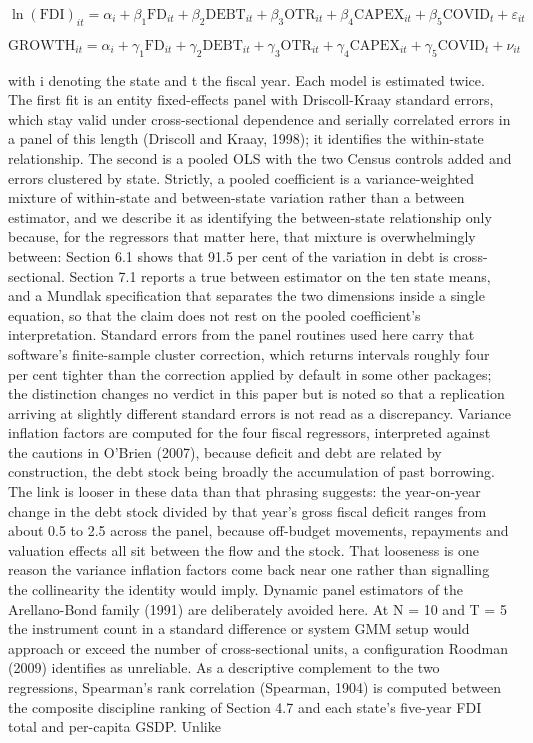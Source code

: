 \documentclass[12pt,a4paper]{article}
\begin{document}
\begin{equation}
\ln(\mathrm{FDI})_{it} = \alpha_i + \beta_1 \mathrm{FD}_{it} + \beta_2 \mathrm{DEBT}_{it} + \beta_3 \mathrm{OTR}_{it} + \beta_4 \mathrm{CAPEX}_{it} + \beta_5 \mathrm{COVID}_{t} + \varepsilon_{it}
\end{equation}

\begin{equation}
\mathrm{GROWTH}_{it} = \alpha_i + \gamma_1 \mathrm{FD}_{it} + \gamma_2 \mathrm{DEBT}_{it} + \gamma_3 \mathrm{OTR}_{it} + \gamma_4 \mathrm{CAPEX}_{it} + \gamma_5 \mathrm{COVID}_{t} + \nu_{it}
\end{equation}

with i denoting the state and t the fiscal year. Each model is estimated twice. The first fit is an entity fixed-effects panel with Driscoll-Kraay standard errors, which stay valid under cross-sectional dependence and serially correlated errors in a panel of this length (Driscoll and Kraay, 1998); it identifies the within-state relationship. The second is a pooled OLS with the two Census controls added and errors clustered by state. Strictly, a pooled coefficient is a variance-weighted mixture of within-state and between-state variation rather than a between estimator, and we describe it as identifying the between-state relationship only because, for the regressors that matter here, that mixture is overwhelmingly between: Section 6.1 shows that 91.5 per cent of the variation in debt is cross-sectional. Section 7.1 reports a true between estimator on the ten state means, and a Mundlak specification that separates the two dimensions inside a single equation, so that the claim does not rest on the pooled coefficient's interpretation. Standard errors from the panel routines used here carry that software's finite-sample cluster correction, which returns intervals roughly four per cent tighter than the correction applied by default in some other packages; the distinction changes no verdict in this paper but is noted so that a replication arriving at slightly different standard errors is not read as a discrepancy. Variance inflation factors are computed for the four fiscal regressors, interpreted against the cautions in O’Brien (2007), because deficit and debt are related by construction, the debt stock being broadly the accumulation of past borrowing. The link is looser in these data than that phrasing suggests: the year-on-year change in the debt stock divided by that year's gross fiscal deficit ranges from about 0.5 to 2.5 across the panel, because off-budget movements, repayments and valuation effects all sit between the flow and the stock. That looseness is one reason the variance inflation factors come back near one rather than signalling the collinearity the identity would imply. Dynamic panel estimators of the Arellano-Bond family (1991) are deliberately avoided here. At N = 10 and T = 5 the instrument count in a standard difference or system GMM setup would approach or exceed the number of cross-sectional units, a configuration Roodman (2009) identifies as unreliable. As a descriptive complement to the two regressions, Spearman's rank correlation (Spearman, 1904) is computed between the composite discipline ranking of Section 4.7 and each state's five-year FDI total and per-capita GSDP. Unlike 
\end{document}
